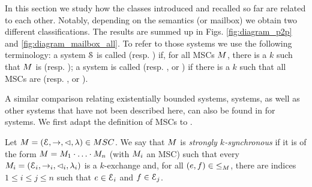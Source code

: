 \documentclass[a4paper,UKenglish,cleveref, autoref, thm-restate]{lipics-v2021}
\begin{document}
In this section we study how the classes introduced and recalled so far are related to each other. Notably, depending on the semantics (\pp or mailbox) we obtain two different classifications. The results are summed up in Figs. \ref{fig:diagram_p2p} and \ref{fig:diagram_mailbox_all}.
To refer to those systems we use the following terminology:
a system $\mathcal{S}$ is called
\wS{} (resp. \sS{}) if, for all MSCs $M$, there is a $k$ such that $M$ is  (resp. );
a system is called  (resp. , \eb{} or \ub{})
if there is a $k$ such that all MSCs are  (resp. ,  or ).

A similar comparison relating existentially bounded systems,  systems, as well as other systems that have not been described here, can also be found in \cite{DBLP:journals/corr/abs-1901-09606} for \pp systems. We first adapt the definition of  MSCs to \pp.

\begin{definition}
	Let $\msc = (\Events,\procrel,\lhd,\lambda) \in \MSCs$.
	We say that $M$ is \emph{strongly $k$-synchronous}
	if it is of the form
	$M = M_1 \cdot \ldots \cdot M_n$ (with $M_i$ an MSC)
	such that every $M_i = (\mathcal{E}_i,\to_i,\lhd_i,\lambda_i)$ is a $k$-exchange
	and, for all $(e,f) \in {\le}_M$, there are indices $1 \le i \le j \le n$
	such that $e \in \mathcal{E}_i$ and $f \in \mathcal{E}_j$.
\end{definition}
\end{document}
